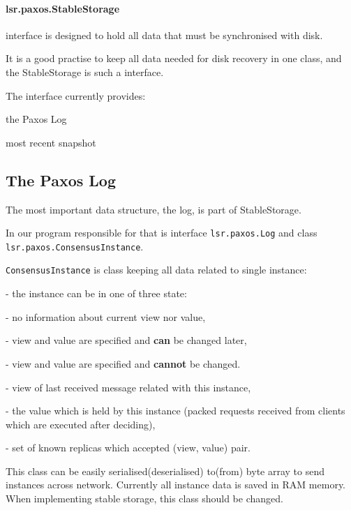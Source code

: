 \paragraph{\normalfont \ttfamily lsr.paxos.StableStorage} interface is designed to hold all data that must be synchronised with disk.

It is a good practise to keep all data needed for disk recovery in one class, and the StableStorage is such a interface.

The interface currently provides:
\begin{description}
\setlength{\itemindent}{0pt}
  \item[log] the Paxos Log
  \item[snapshot] most recent snapshot
\end{description}


\subsection{The Paxos Log}
\label{subsubsec:the_paxos_log}
The most important data structure, the log, is part of StableStorage.

In our program responsible for that is interface \texttt{lsr.paxos.Log} and class \texttt{lsr.paxos.Con\-sen\-susInstance}.

\texttt{ConsensusInstance} is class keeping all data related to single instance:
\begin{description}
  \setlength{\itemindent}{0pt}
  \item[state] - the instance can be in one of three state:
  \begin{description}
    \setlength{\itemindent}{0pt}
    \item[\tiny UNKNOWN] - no information about current view nor value,
    \item[\tiny KNOWN] - view and value are specified and \textbf{can} be changed later,
    \item[\tiny DECIDED] - view and value are specified and \textbf{cannot} be changed.
  \end{description}
  \item[view] - view of last received message related with this instance,
  \item[value] - the value which is held by this instance (packed requests received from clients which are executed after deciding),
  \item[accepts] - set of known replicas which accepted (view, value) pair.
\end{description}
This class can be easily serialised(deserialised) to(from) byte array to send instances across network. Currently all instance data is saved in RAM memory. When implementing stable storage, this class should be changed.

